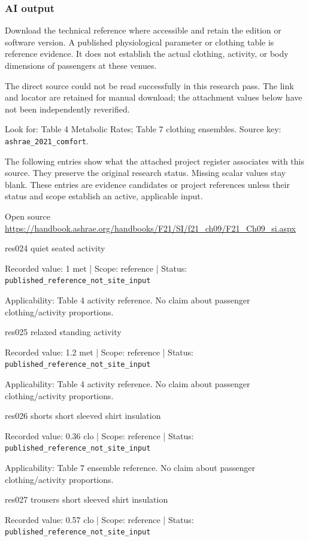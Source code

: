 \subsubsection*{AI output}
Download the technical reference where accessible and retain the edition or software version. A published physiological parameter or clothing table is reference evidence. It does not establish the actual clothing, activity, or body dimensions of passengers at these venues.

The direct source could not be read successfully in this research pass. The link and locator are retained for manual download; the attachment values below have not been independently reverified.

Look for: Table 4 Metabolic Rates; Table 7 clothing ensembles. Source key: \nolinkurl{ashrae_2021_comfort}.

The following entries show what the attached project register associates with this source. They preserve the original research status. Missing scalar values stay blank. These entries are evidence candidates or project references unless their status and scope establish an active, applicable input.

Open source  \url{https://handbook.ashrae.org/handbooks/F21/SI/f21_ch09/F21_Ch09_si.aspx}

res024  quiet seated activity

Recorded value: 1 met | Scope: reference | Status: \nolinkurl{published_reference_not_site_input}

Applicability: Table 4 activity reference. No claim about passenger clothing/activity proportions.

res025  relaxed standing activity

Recorded value: 1.2 met | Scope: reference | Status: \nolinkurl{published_reference_not_site_input}

Applicability: Table 4 activity reference. No claim about passenger clothing/activity proportions.

res026  shorts short sleeved shirt insulation

Recorded value: 0.36 clo | Scope: reference | Status: \nolinkurl{published_reference_not_site_input}

Applicability: Table 7 ensemble reference. No claim about passenger clothing/activity proportions.

res027  trousers short sleeved shirt insulation

Recorded value: 0.57 clo | Scope: reference | Status: \nolinkurl{published_reference_not_site_input}

